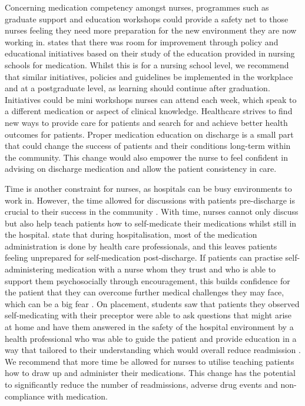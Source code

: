 \documentclass[british,12pt,a4paper]{article}
\begin{document}
Concerning medication competency amongst nurses, programmes such as graduate support and education workshops could provide a safety net to those nurses feeling they need more preparation for the new environment they are now working in. \citeauthor{Sulosaari2014} states that there was room for improvement through policy and educational initiatives based on their study of the education provided in nursing schools for medication. Whilst this is for a nursing school level, we recommend that similar initiatives, policies and guidelines be implemented in the workplace and at a postgraduate level, as learning should continue after graduation. Initiatives could be mini workshops nurses can attend each week, which speak to a different medication or aspect of clinical knowledge. Healthcare strives to find new ways to provide care for patients and search for and achieve better health outcomes for patients. Proper medication education on discharge is a small part that could change the success of patients and their conditions long-term within the community. This change would also empower the nurse to feel confident in advising on discharge medication and allow the patient consistency in care.

Time is another constraint for nurses, as hospitals can be busy environments to work in. However, the time allowed for discussions with patients pre-discharge is crucial to their success in the community \parencite{Sanjai2019}. With time, nurses cannot only discuss but also help teach patients how to self-medicate their medications whilst still in the hospital. \citeauthor{Mortelmans2021} state that during hospitalisation, most of the medication administration is done by health care professionals, and this leaves patients feeling unprepared for self-medication post-discharge. If patients can practise self-administering medication with a nurse whom they trust and who is able to support them psychosocially through encouragement, this builds confidence for the patient that they can overcome further medical challenges they may face, which can be a big fear \parencite{Sanjai2019}. On placement, students saw that patients they observed self-medicating with their preceptor were able to ask questions that might arise at home and have them answered in the safety of the hospital environment by a health professional who was able to guide the patient and provide education in a way that tailored to their understanding which would overall reduce readmission \parencite{Sanjai2019}. We recommend that more time be allowed for nurses to utilise teaching patients how to draw up and administer their medications. This change has the potential to significantly reduce the number of readmissions, adverse drug events and non-compliance with medication.
\end{document}
